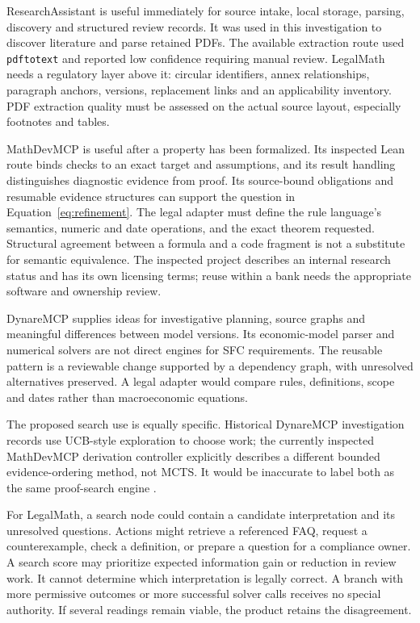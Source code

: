 ResearchAssistant is useful immediately for source intake, local storage, parsing,
discovery and structured review records. It was used in this investigation to
discover literature and parse retained PDFs. The available extraction route used
\texttt{pdftotext} and reported low confidence requiring manual review. LegalMath
needs a regulatory layer above it: circular identifiers, annex relationships,
paragraph anchors, versions, replacement links and an applicability inventory.
PDF extraction quality must be assessed on the actual source layout, especially
footnotes and tables.

MathDevMCP is useful after a property has been formalized. Its inspected Lean
route binds checks to an exact target and assumptions, and its result handling
distinguishes diagnostic evidence from proof. Its source-bound obligations and
resumable evidence structures can support the question in
Equation~\eqref{eq:refinement}. The legal adapter must define the rule language's
semantics, numeric and date operations, and the exact theorem requested. Structural
agreement between a formula and a code fragment is not a substitute for semantic
equivalence. The inspected project describes an internal research status and
has its own licensing terms; reuse within a bank needs the appropriate software
and ownership review.


DynareMCP supplies ideas for investigative planning, source graphs and meaningful
differences between model versions. Its economic-model parser and numerical
solvers are not direct engines for SFC requirements. The reusable pattern is a
reviewable change supported by a dependency graph, with unresolved alternatives
preserved. A legal adapter would compare rules, definitions, scope and dates
rather than macroeconomic equations.

The proposed search use is equally specific. Historical DynareMCP investigation
records use UCB-style exploration to choose work; the currently inspected
MathDevMCP derivation controller explicitly describes a different bounded
evidence-ordering method, not MCTS. It would be inaccurate to label both as the
same proof-search engine \citep{localrepos}.

For LegalMath, a search node could contain a candidate interpretation and its
unresolved questions. Actions might retrieve a referenced FAQ, request a
counterexample, check a definition, or prepare a question for a compliance owner.
A search score may prioritize expected information gain or reduction in review
work. It cannot determine which interpretation is legally correct. A branch with
more permissive outcomes or more successful solver calls receives no special
authority. If several readings remain viable, the product retains the disagreement.


